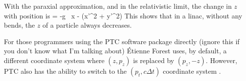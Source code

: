 With the paraxial approximation, and in the relativistic limit, the
change in $z$ with position is
\Begineq
   = -g \, x -  (x'^2 + y'^2)
\Endeq
This shows that in a linac, without any bends, the $z$ of a particle
always decreases.

For those programmers using the PTC
software package directly (ignore
this if you don't know what I'm talking about) \'Etienne Forest uses,
by default, a different coordinate system where $(z, p_z)$ is replaced
by $(p_z, -z)$. However, PTC also has the ability to switch to the
$(p_t, c \Delta t)$ coordinate system .

